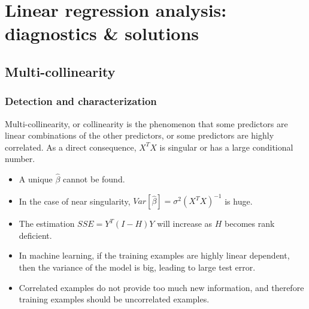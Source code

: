 \begin{refsection}
\begin{note}
\end{note}





\section{Linear regression analysis: diagnostics \& solutions}



\subsection{Multi-collinearity}
\subsubsection{Detection and characterization}
\begin{definition}
	Multi-collinearity, or collinearity is the phenomenon that some predictors are linear combinations of the other predictors, or some predictors are highly correlated. As a direct consequence, $X^TX$ is singular or has a large conditional number.
\end{definition}


\begin{remark}\hfill
	\begin{itemize}
		\item A unique $\hat{\beta}$ cannot be found.
		\item In the case of near singularity, $Var[\hat{\beta}] = \sigma^2(X^TX)^{-1}$ is huge.
		\item The estimation $SSE = Y^T(I-H)Y$ will increase as $H$ becomes rank deficient.
	\end{itemize}
\end{remark}


\begin{remark}\hfill
	\begin{itemize}
		\item In machine learning, if the training examples are highly linear dependent, then the variance of the model is big, leading to large test error.
		\item Correlated examples do not provide too much new information, and therefore training examples should be uncorrelated examples. 
	\end{itemize}
\end{remark}



\end{refsection}

